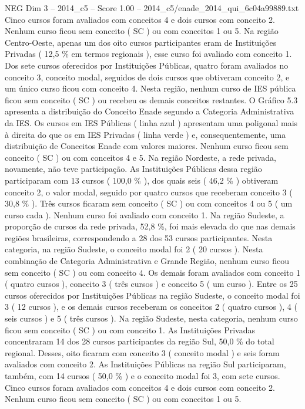 \begin{textsample}{NEG Dim 3 – 2014\_c5 – Score 1.00 – 2014\_c5/enade\_2014\_qui\_6c04a99889.txt}
Cinco cursos foram avaliados com conceitos 4 e dois cursos com conceito 2.
Nenhum curso ficou sem conceito ( SC ) ou com conceitos 1 ou 5.
Na região Centro-Oeste, apenas um dos oito cursos participantes eram de Instituições Privadas ( 12,5 \% em termos regionais ), esse curso foi avaliado com conceito 1.
Dos sete cursos oferecidos por Instituições Públicas, quatro foram avaliados no conceito 3, conceito modal, seguidos de dois cursos que obtiveram conceito 2, e um único curso ficou com conceito 4.
Nesta região, nenhum curso de IES pública ficou sem conceito ( SC ) ou recebeu os demais conceitos restantes.
O Gráfico 5.3 apresenta a distribuição do Conceito Enade segundo a Categoria Administrativa da IES.
Os cursos em IES Públicas ( linha azul ) apresentam uma poligonal mais à direita do que os em IES Privadas ( linha verde ) e, consequentemente, uma distribuição de Conceitos Enade com valores maiores.
Nenhum curso ficou sem conceito ( SC ) ou com conceitos 4 e 5.
Na região Nordeste, a rede privada, novamente, não teve participação.
As Instituições Públicas dessa região participaram com 13 cursos ( 100,0 \% ), dos quais seis ( 46,2 \% ) obtiveram conceito 2, o valor modal, seguido por quatro cursos que receberam conceito 3 ( 30,8 \% ).
Três cursos ficaram sem conceito ( SC ) ou com conceitos 4 ou 5 ( um curso cada ).
Nenhum curso foi avaliado com conceito 1.
Na região Sudeste, a proporção de cursos da rede privada, 52,8 \%, foi mais elevada do que nas demais regiões brasileiras, correspondendo a 28 dos 53 cursos participantes.
Nesta categoria, na região Sudeste, o conceito modal foi 2 ( 20 cursos ).
Nesta combinação de Categoria Administrativa e Grande Região, nenhum curso ficou sem conceito ( SC ) ou com conceito 4.
Os demais foram avaliados com conceito 1 ( quatro cursos ), conceito 3 ( três cursos ) e conceito 5 ( um curso ).
Entre os 25 cursos oferecidos por Instituições Públicas na região Sudeste, o conceito modal foi 3 ( 12 cursos ), e os demais cursos receberam os conceitos 2 ( quatro cursos ), 4 ( seis cursos ) e 5 ( três cursos ).
Na região Sudeste, nesta categoria, nenhum curso ficou sem conceito ( SC ) ou com conceito 1.
As Instituições Privadas concentraram 14 dos 28 cursos participantes da região Sul, 50,0 \% do total regional.
Desses, oito ficaram com conceito 3 ( conceito modal ) e seis foram avaliados com conceito 2.
As Instituições Públicas na região Sul participaram, também, com 14 cursos ( 50,0 \% ) e o conceito modal foi 3, com sete cursos.
Cinco cursos foram avaliados com conceitos 4 e dois cursos com conceito 2.
Nenhum curso ficou sem conceito ( SC ) ou com conceitos 1 ou 5.

\end{textsample}

